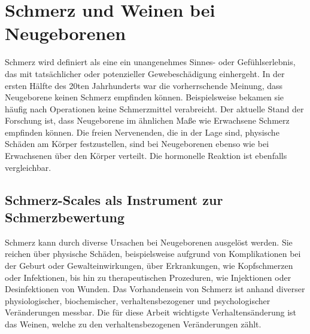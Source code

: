 \section{Schmerz und Weinen bei Neugeborenen}
\label{sec:medicalFoundations} 

Schmerz wird definiert als eine \glqq ein unangenehmes Sinnes- oder Gefühlserlebnis, das mit tatsächlicher oder potenzieller Gewebeschädigung einhergeht\grqq{}.\cite[S. 438]{PainAssessment01} In der ersten Hälfte des 20ten Jahrhunderts war die vorherrschende Meinung, dass Neugeborene keinen Schmerz empfinden können. Beispielsweise bekamen sie häufig nach Operationen keine Schmerzmittel verabreicht. Der aktuelle Stand der Forschung ist, dass Neugeborene im ähnlichen Maße wie Erwachsene Schmerz empfinden können. Die freien Nervenenden, die in der Lage sind, physische Schäden am Körper festzustellen, sind bei Neugeborenen ebenso wie bei Erwachsenen über den Körper verteilt. Die hormonelle Reaktion ist ebenfalls vergleichbar.\cite[S. 402]{PainAssessment03} \cite[S. 438]{PainAssessment01}

\subsection{Schmerz-Scales als Instrument zur Schmerzbewertung}
\label{sec:painScores}

Schmerz kann durch diverse Ursachen bei Neugeborenen ausgelöst werden. Sie reichen über physische Schäden, beispielsweise aufgrund von Komplikationen bei der Geburt oder Gewalteinwirkungen, über Erkrankungen, wie Kopfschmerzen oder Infektionen, bis hin zu therapeutischen Prozeduren, wie Injektionen oder Desinfektionen von Wunden. Das Vorhandensein von Schmerz ist anhand diverser physiologischer, biochemischer, verhaltensbezogener und psychologischer Veränderungen messbar. Die für diese Arbeit wichtigste Verhaltensänderung ist das Weinen, welche zu den verhaltensbezogenen Veränderungen zählt.\cite[S. 441]{PainAssessment01} 

